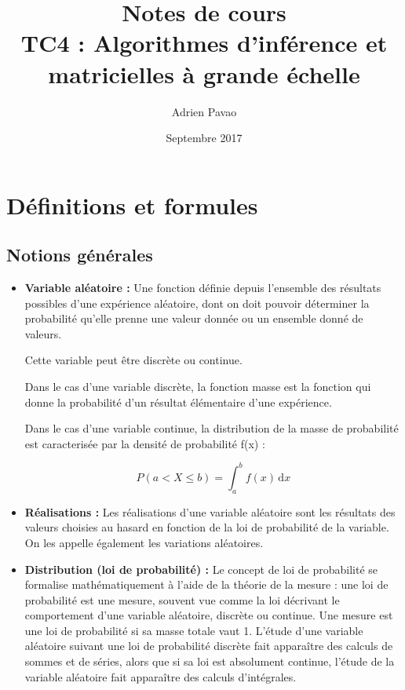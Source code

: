 \documentclass{article}
\title{Notes de cours\\TC4 : Algorithmes d'inférence et matricielles à grande échelle}
\author{Adrien Pavao}
\date{Septembre 2017}
\begin{document}
\maketitle

\tableofcontents

\section{Définitions et formules}

\subsection{Notions générales}

\begin{itemize}
\item \textbf{Variable aléatoire :} Une fonction définie depuis l'ensemble des résultats possibles d'une expérience aléatoire, dont on doit pouvoir déterminer la probabilité qu'elle prenne une valeur donnée ou un ensemble donné de valeurs. 

Cette variable peut être discrète ou continue.

Dans le cas d'une variable discrète, la fonction masse est la fonction qui donne la probabilité d'un résultat élémentaire d'une expérience.

Dans le cas d'une variable continue, la distribution de la masse de probabilité est caracterisée par la densité de probabilité f(x) : 

\[ P(a < X \leq b)  = \displaystyle \int_{a}^{b} f(x) \, \mathrm{d}x \]

\item \textbf{Réalisations :} Les réalisations d'une variable aléatoire sont les résultats des valeurs choisies au hasard en fonction de la loi de probabilité de la variable. On les appelle également les variations aléatoires.

\item \textbf{Distribution (loi de probabilité) :} Le concept de loi de probabilité se formalise mathématiquement à l'aide de la théorie de la mesure : une loi de probabilité est une mesure, souvent vue comme la loi décrivant le comportement d'une variable aléatoire, discrète ou continue. Une mesure est une loi de probabilité si sa masse totale vaut 1. L'étude d'une variable aléatoire suivant une loi de probabilité discrète fait apparaître des calculs de sommes et de séries, alors que si sa loi est absolument continue, l'étude de la variable aléatoire fait apparaître des calculs d'intégrales.


\end{itemize}
\end{document}
